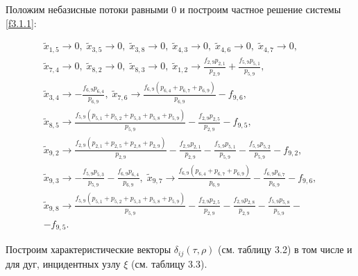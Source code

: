 \documentclass[14pt]{extarticle}%
\begin{document}
Положим небазисные потоки равными 0 и построим частное решение системы \eqref{f3.1.1}:

\begin{equation}
\begin{gathered}
\tilde{x}_{1,5}\to 0,\;
\tilde{x}_{3,5}\to 0,\;
\tilde{x}_{3,8}\to 0,\;
\tilde{x}_{4,3}\to 0,\;
\tilde{x}_{4,6}\to 0,\;
\tilde{x}_{4,7}\to 0,\\
\tilde{x}_{7,4}\to 0,\;
\tilde{x}_{8,2}\to 0,\;
\tilde{x}_{8,3}\to 0,\;
\tilde{x}_{1,2}\to \frac{f_{2,9} p_{2,1}}{p_{2,9}}+\frac{f_{5,9} p_{5,1}}{p_{5,9}},\\
\tilde{x}_{3,4}\to -\frac{f_{6,9} p_{6,4}}{p_{6,9}},\;
\tilde{x}_{7,6}\to \frac{f_{6,9} \left(p_{6,4}+p_{6,7}+p_{6,9}\right)}{p_{6,9}}-f_{9,6},\\
\tilde{x}_{8,5}\to \frac{f_{5,9} \left(p_{5,1}+p_{5,2}+p_{5,3}+p_{5,8}+p_{5,9}\right)}{p_{5,9}}-\frac{f_{2,9} p_{2,5}}{p_{2,9}}-f_{9,5},\\
\tilde{x}_{9,2}\to \frac{f_{2,9} \left(p_{2,1}+p_{2,5}+p_{2,8}+p_{2,9}\right)}{p_{2,9}}-\frac{f_{2,9} p_{2,1}}{p_{2,9}}-\frac{f_{5,9} p_{5,1}}{p_{5,9}}-\frac{f_{5,9} p_{5,2}}{p_{5,9}}-f_{9,2},\\
\tilde{x}_{9,3}\to -\frac{f_{5,9} p_{5,3}}{p_{5,9}}-\frac{f_{6,9} p_{6,4}}{p_{6,9}},\;
\tilde{x}_{9,7}\to \frac{f_{6,9} \left(p_{6,4}+p_{6,7}+p_{6,9}\right)}{p_{6,9}}-\frac{f_{6,9} p_{6,7}}{p_{6,9}}-f_{9,6},\\
\tilde{x}_{9,8}\to \frac{f_{5,9} \left(p_{5,1}+p_{5,2}+p_{5,3}+p_{5,8}+p_{5,9}\right)}{p_{5,9}}-\frac{f_{2,9} p_{2,5}}{p_{2,9}}-\frac{f_{2,9} p_{2,8}}{p_{2,9}}-\frac{f_{5,9} p_{5,8}}{p_{5,9}}-\\-f_{9,5}.
\end{gathered}
\end{equation}



Построим характеристические векторы $\delta_{ij}(\tau,\rho)$ (см. таблицу 3.2) в том числе и для дуг, инцидентных узлу $\xi$ (см. таблицу 3.3).
\end{document}
